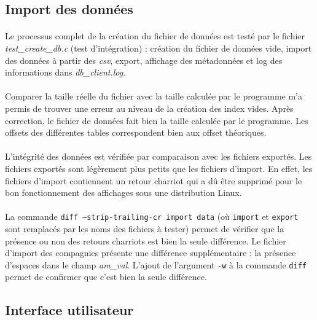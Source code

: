 \documentclass{article}
\begin{document}
    \subsection{Import des données}
    \paragraph{}
    Le processus complet de la création du fichier de données est testé par le fichier \emph{test\_create\_db.c} (test d'intégration) : création du fichier de données vide, import des données à partir des \emph{csv}, export, affichage des métadonnées et log des informations dans \emph{db\_client.log}.

    \paragraph{}
    Comparer la taille réelle du fichier avec la taille calculée par le programme m'a permis de trouver une erreur au niveau de la création des index vides. Après correction, le fichier de données fait bien la taille calculée par le programme. Les offsets des différentes tables correspondent bien aux offset théoriques.

    \paragraph{}
    L'intégrité des données est vérifiée par comparaison avec les fichiers exportés. Les fichiers exportés sont légèrement plus petits que les fichiers d'import. En effet, les fichiers d'import contiennent un retour charriot qui a dû être supprimé pour le bon fonctionnement des affichages sous une distribution Linux.
    
    \paragraph{}
    La commande \texttt{diff --strip-trailing-cr import data} (où \texttt{import} et \texttt{export} sont remplacés par les noms des fichiers à tester) permet de vérifier que la présence ou non des retours charriots est bien la seule différence. Le fichier d'import des compagnies présente une différence supplémentaire : la présence d'espaces dans le champ \emph{am\_val}. L'ajout de l'argument \texttt{-w} à la commande \texttt{diff} permet de confirmer que c'est bien la seule différence.


    \subsection{Interface utilisateur}
\end{document}
